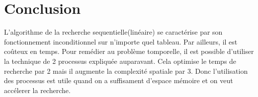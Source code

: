 \section{Conclusion}
L'algorithme de la recherche sequentielle(linéaire) se caractérise par son fonctionnement inconditionnel sur n'importe quel tableau. Par ailleurs, il est coûteux en temps. Pour remédier au problème tomporelle, il est possible d'utiliser  la technique de 2 processus expliquée auparavant. Cela optimise le temps de recherche par 2 mais il augmente la complexité spatiale par 3. Donc l'utilisation des processus est utile quand on a suffisament d'espace mémoire et on veut accélerer la recherche.